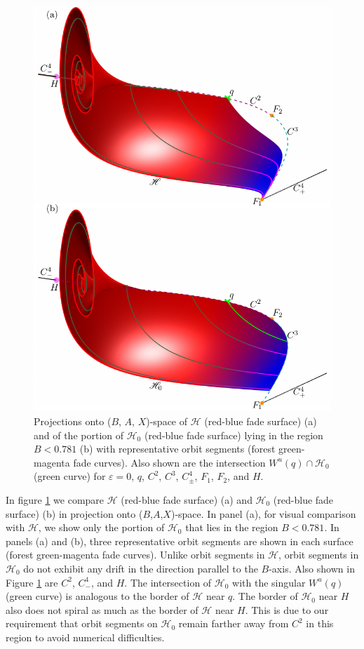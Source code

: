 \documentclass{ws-ijbc}
\begin{document}
\begin{figure}[H]
\centering
\includegraphics[]{./figures/MKMO_11.pdf}
\caption{Projections onto ($B$, $A$, $X$)-space of $\mathscr{H}$ (red-blue fade surface) (a) and of the portion of $\mathscr{H}_0$ (red-blue fade surface) lying in the region $B < 0.781$ (b) with representative orbit segments (forest green-magenta fade curves).  Also shown are the intersection $W^u(q)\cap\mathscr{H}_0$ (green curve) for $\varepsilon=0$, $q$, $C^2$, $C^3$, $C^4_\pm$, $F_1$, $F_2$, and $H$.}
\label{figure_11}
\end{figure}

In figure \ref{figure_11} we compare $\mathscr{H}$ (red-blue fade surface) (a) and $\mathscr{H}_0$ (red-blue fade surface) (b) in projection onto ($B$,$A$,$X$)-space.  In panel (a), for visual comparison with $\mathscr{H}$, we show only the portion of $\mathscr{H}_0$ that lies in the region $B < 0.781$.  In panels (a) and (b), three representative orbit segments are shown in each surface (forest green-magenta fade curves).  Unlike orbit segments in $\mathscr{H}$, orbit segments in $\mathscr{H}_0$ do not exhibit any drift in the direction parallel to the $B$-axis.  Also shown in Figure \ref{figure_11} are $C^2$, $C^4_-$, and $H$.  The intersection of $\mathscr{H}_0$ with the singular $W^u(q)$ (green curve) is analogous to the border of $\mathscr{H}$ near $q$.  The border of $\mathscr{H}_0$ near $H$ also does not spiral as much as the border of $\mathscr{H}$ near $H$.  This is due to our requirement that orbit segments on $\mathscr{H}_0$ remain farther away from $C^2$ in this region to avoid numerical difficulties.
\end{document}
